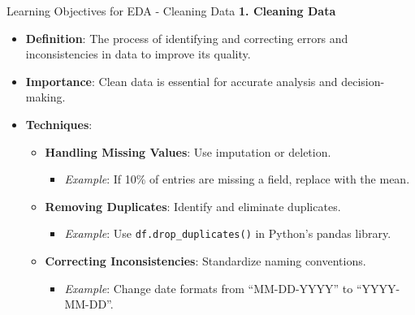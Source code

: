 \documentclass[aspectratio=169]{beamer}
\begin{document}
\begin{frame}[fragile]{Learning Objectives for EDA - Cleaning Data}
    \textbf{1. Cleaning Data}
    \begin{itemize}
        \item \textbf{Definition}: The process of identifying and correcting errors and inconsistencies in data to improve its quality.
        \item \textbf{Importance}: Clean data is essential for accurate analysis and decision-making.
        \item \textbf{Techniques}:
        \begin{itemize}
            \item \textbf{Handling Missing Values}: Use imputation or deletion.
            \begin{itemize}
                \item \textit{Example}: If 10\% of entries are missing a field, replace with the mean.
            \end{itemize}
            \item \textbf{Removing Duplicates}: Identify and eliminate duplicates.
            \begin{itemize}
                \item \textit{Example}: Use \texttt{df.drop\_duplicates()} in Python's pandas library.
            \end{itemize}
            \item \textbf{Correcting Inconsistencies}: Standardize naming conventions.
            \begin{itemize}
                \item \textit{Example}: Change date formats from ``MM-DD-YYYY'' to ``YYYY-MM-DD''.
            \end{itemize}
        \end{itemize}
    \end{itemize}
\end{frame}
\end{document}
